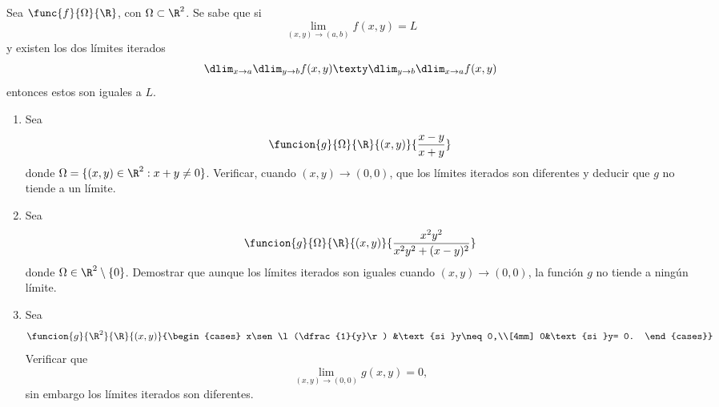 \documentclass[a4,11pt]{aleph-notas}
\begin{document}
\begin{ejer}
Sea $\func{f}{\Omega}{\R}$, con $\Omega \subset \R^2$. Se sabe que si 
    \[
        \lim_{(x,y)\to(a,b)}f(x,y)=L
    \]
    y existen los dos límites iterados 
    \[
              \dlim_{x\to a}\dlim_{y\to b}f(x,y) \texty \dlim_{y\to b}\dlim_{x\to a}f(x,y)
    \]
    entonces estos son iguales a $L$. 
    \begin{enumerate}
        \item Sea
            \[
                \funcion{g}{\Omega}{\R}{(x,y)}{\frac{x-y}{x+y}}
            \]
            donde $\Omega=\lbrace (x,y)\in \R^2:x+y\neq 0 \rbrace $. Verificar, cuando $(x,y)\to (0,0)$, que los límites iterados son diferentes y deducir que $g$ no tiende a un límite.
        \item Sea
            \[
                \funcion{g}{\Omega}{\R}{(x,y)}{\frac{x^2y^2}{x^2y^2+(x-y)^2}}
            \]
            donde $\Omega \in \R^2 \setminus \lbrace 0 \rbrace$. Demostrar que aunque los límites iterados son iguales cuando $(x,y)\to (0,0)$, la función $g$ no tiende a ningún límite.
        \item Sea
            \[
                \funcion{g}{\R^2}{\R}{(x,y)}
                    {\begin{cases}                    
                    x\sen\l(\dfrac{1}{y}\r) &\text{si }y\neq 0,\\[4mm]
                    0&\text{si }y= 0.
                \end{cases}}
            \]
            Verificar que 
            \[
                \lim_{(x,y)\to (0,0)}g(x,y)=0,
            \]
            sin embargo los límites iterados son diferentes.
    \end{enumerate}
\end{ejer}
\end{document}
